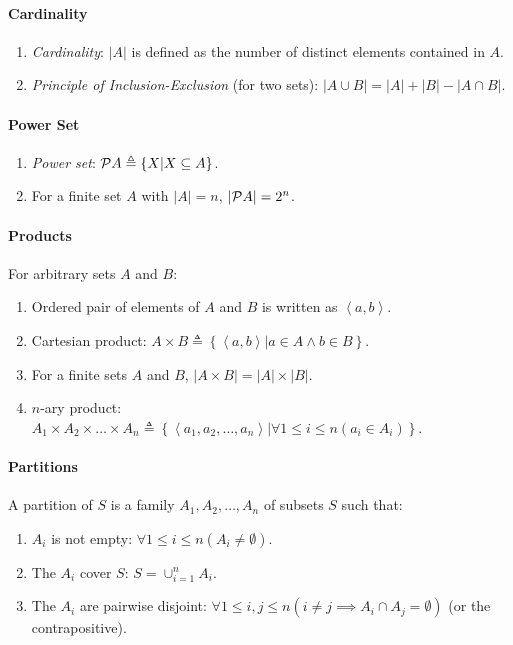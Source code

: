\documentclass[10pt,twoside,twocolumn]{article}
\begin{document}
\paragraph{Cardinality}
\begin{enumerate}
\item \emph{Cardinality}: $\left|A\right|$ is defined as the number of
distinct elements contained in $A$.
\item \emph{Principle of Inclusion-Exclusion} (for two sets): $\left|A\cup B\right|=\left|A\right|+\left|B\right|-\left|A\cap B\right|$.
\end{enumerate}

\paragraph{Power Set}
\begin{enumerate}
\item \emph{Power set}: ${\cal P}A\triangleq\left\{ X|X\subseteq A\right\} $.
\item For a finite set $A$ with $\left|A\right|=n$, $\left|{\cal P}A\right|=2^{n}$.
\end{enumerate}

\paragraph{Products}

For arbitrary sets $A$ and $B$:
\begin{enumerate}
\item Ordered pair of elements of $A$ and $B$ is written as $\left\langle a,b\right\rangle $.
\item Cartesian product: $A\times B\triangleq\left\{ \left\langle a,b\right\rangle |a\in A\land b\in B\right\} $.
\item For a finite sets $A$ and $B$, $\left|A\times B\right|=\left|A\right|\times\left|B\right|$.
\item $n$-ary product: $A_{1}\times A_{2}\times\dots\times A_{n}\triangleq\left\{ \left\langle a_{1},a_{2},\dots,a_{n}\right\rangle |\forall1\leq i\leq n\left(a_{i}\in A_{i}\right)\right\} $.
\end{enumerate}

\paragraph{Partitions}

A partition of $S$ is a family $A_{1},A_{2},\dots,A_{n}$ of subsets
$S$ such that:
\begin{enumerate}
\item \noindent $A_{i}$ is not empty: $\forall1\leq i\leq n\left(A_{i}\neq\emptyset\right)$.
\item The $A_{i}$ cover $S$: $S=\cup_{i=1}^{n}A_{i}$.
\item The $A_{i}$ are pairwise disjoint: $\forall1\leq i,j\leq n\left(i\neq j\implies A_{i}\cap A_{j}=\emptyset\right)$
(or the contrapositive).
\end{enumerate}
\end{document}
